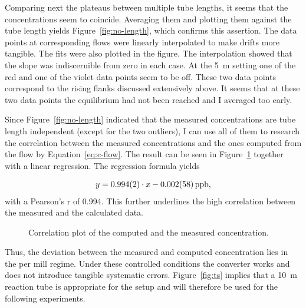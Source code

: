Comparing next the  plateaus between multiple tube lengths, it
seems that the concentrations seem to coincide. Averaging them and
plotting them against the tube length yields
Figure~\ref{fig:no-length}, which confirms this assertion. The data
points at corresponding flows were linearly interpolated to make
drifts more tangible. The fits were also plotted in the figure. The
interpolation showed that the slope was indiscernible from zero in
each case. At the \SI{5}{\meter} setting one of the red and one of the
violet data points seem to be off. These two data points correspond to
the rising flanks discussed extensively above. It seems that at these
two data points the equilibrium had not been reached and I averaged
too early.

Since Figure~\ref{fig:no-length} indicated that the measured
concentrations are tube length independent (except for the two
outliers), I can use all of them to research the correlation between
the measured concentrations and the ones computed from the flow by
Equation~\eqref{eq:c-flow}. The result can be seen in
Figure~\ref{fig:no-calib} together with a linear regression. The
regression formula yields

\begin{align*}
  y = \num{0.994 \pm 0.002}  \cdot x -\SI{0.002 \pm 0.058}{ppb},
\end{align*}
with a Pearson's r of 0.994. This further underlines the high
correlation between the measured and the calculated data.

\begin{figure}[htbp]
  \centering
  
  \caption{Correlation plot of the computed and the measured 
    concentration.}
  \label{fig:no-calib}
\end{figure}

Thus, the deviation between the measured and computed concentration
lies in the per mill regime. Under these controlled conditions the
converter works and does not introduce tangible systematic
errors. Figure~\ref{fig:ts} implies that a \SI{10}{\meter} reaction
tube is appropriate for the setup and will therefore be used for the
following experiments.

